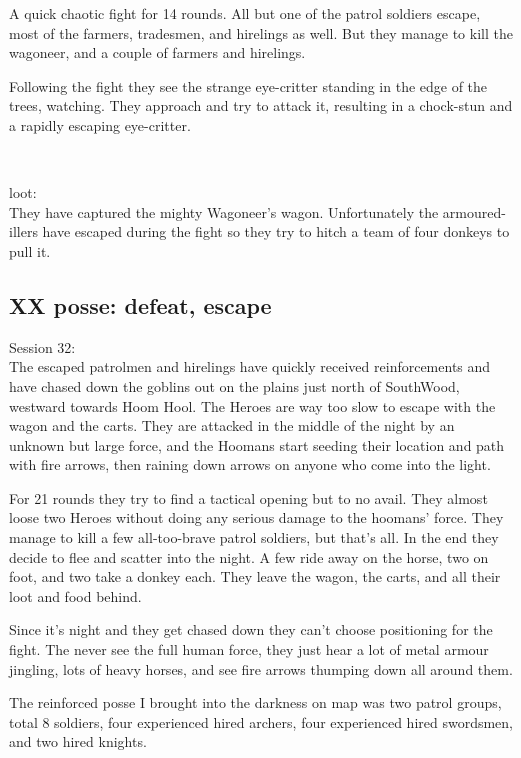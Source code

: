 A quick chaotic fight for 14 rounds. All but one of the patrol soldiers escape, most of the farmers, tradesmen, and hirelings as well. But they manage to kill the wagoneer, and a couple of farmers and hirelings.

Following the fight they see the strange eye-critter standing in the edge of the trees, watching. They approach and try to attack it, resulting in a chock-stun and a rapidly escaping eye-critter.

\

loot:\\
They have captured the mighty Wagoneer's wagon. Unfortunately the armoured-illers have escaped during the fight so they try to hitch a team of four donkeys to pull it.


\subsection*{XX posse: defeat, escape}

\forceindent Session 32:\\                                              %
The escaped patrolmen and hirelings have quickly received reinforcements and have chased down the goblins out on the plains just north of SouthWood, westward towards Hoom Hool. The Heroes are way too slow to escape with the wagon and the carts. They are attacked in the middle of the night by an unknown but large force, and the Hoomans start seeding their location and path with fire arrows, then raining down arrows on anyone who come into the light.

For 21 rounds they try to find a tactical opening but to no avail. They almost loose two Heroes without doing any serious damage to the hoomans' force. They manage to kill a few all-too-brave patrol soldiers, but that's all. In the end they decide to flee and scatter into the night. A few ride away on the horse, two on foot, and two take a donkey each. They leave the wagon, the carts, and all their loot and food behind.

\begin{readoutloud}
Since it's night and they get chased down they can't choose positioning for the fight. The never see the full human force, they just hear a lot of metal armour jingling, lots of heavy horses, and see fire arrows thumping down all around them.

The reinforced posse I brought into the darkness on map was two patrol groups, total 8 soldiers, four experienced hired archers, four experienced hired swordsmen, and two hired knights.
\end{readoutloud}


